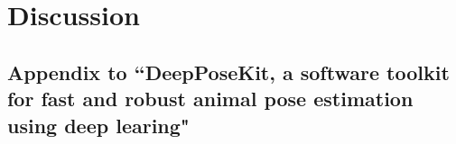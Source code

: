 \documentclass[11pt,a4paper,oneside]{book}
\begin{document}
\chapter*{Discussion}
\newpage

\begin{appendices}
\chapter[DeepPoseKit]{Appendix to ``DeepPoseKit, a software toolkit for fast and robust animal pose estimation using deep learing"}

    \label{app:figures}
    \begin{figure}[!htb]
    

\end{figure}
\end{appendices}
\end{document}
